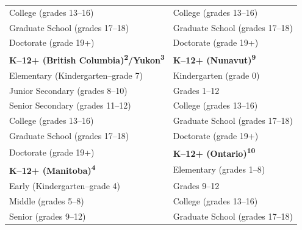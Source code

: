 \documentclass[
]{book}
\theoremstyle{definition}
\theoremstyle{definition}
\theoremstyle{definition}
\theoremstyle{definition}
\theoremstyle{remark}
\begin{document}
\begin{ThreePartTable}
\begin{longtable}[t]{>{}l|l}
\hspace{1em}College (grades 13–16) & \hspace{1em}College (grades 13–16)\\
\hspace{1em}Graduate School (grades 17–18) & \hspace{1em}Graduate School (grades 17–18)\\
\hspace{1em}Doctorate (grade 19+) & \hspace{1em}Doctorate (grade 19+)\\
\textbf{K–12+ (British Columbia)\textsuperscript{2}/Yukon\textsuperscript{3}} & \textbf{K–12+ (Nunavut)\textsuperscript{9}}\\
\hspace{1em}Elementary (Kindergarten–grade 7) & \hspace{1em}Kindergarten (grade 0)\\
\hspace{1em}Junior Secondary (grades 8–10) & \hspace{1em}Grades 1–12\\
\hspace{1em}Senior Secondary (grades 11–12) & \hspace{1em}College (grades 13–16)\\
\hspace{1em}College (grades 13–16) & \hspace{1em}Graduate School (grades \vphantom{1} 17–18)\\
\hspace{1em}Graduate School (grades 17–18) & \hspace{1em}Doctorate (grade \vphantom{1} 19+)\\
\hspace{1em}Doctorate (grade 19+) & \textbf{K–12+ (Ontario)\textsuperscript{10}}\\
\textbf{K–12+ (Manitoba)\textsuperscript{4}} & \hspace{1em}Elementary (grades 1–8)\\
\hspace{1em}Early (Kindergarten–grade 4) & \hspace{1em}Grades 9–12\\
\hspace{1em}Middle (grades 5–8) & \hspace{1em}College (grades 13–16)\\
\hspace{1em}Senior (grades 9–12) & \hspace{1em}Graduate School (grades 17–18)\\

\end{longtable}
\end{ThreePartTable}
\end{document}
